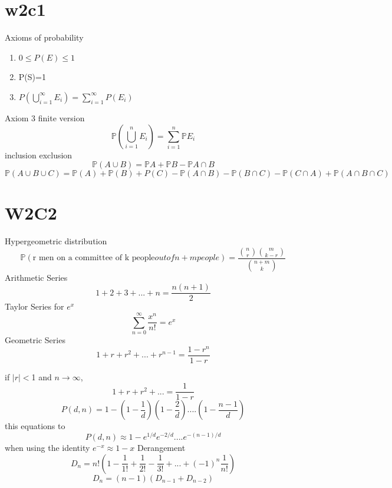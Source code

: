 \documentclass{article}
\begin{document}
\section{w2c1}
Axioms of probability
\begin{enumerate}
  \item 0$\leq P(E)\leq 1$
  \item P(S)=1
  \item $P(\bigcup_{i=1}^{\infty}E_i)=\sum_{i=1}^{\infty}P(E_i)$
\end{enumerate}
Axiom 3 finite version\\
$$
\mathbb{P}(\bigcup_{i=1}^{n}E_i)=\sum_{i=1}^n\mathbb{P}{E_i}
$$
inclusion exclusion
$$
\mathbb{P}(A \cup B)=\mathbb{P}A+\mathbb{P}B-\mathbb{P}{A\cap B}
$$
$$
\mathbb{P}(A\cup B \cup C )=\mathbb{P}(A)+\mathbb{P}(B)+P(C)-\mathbb{P}(A\cap B)- \mathbb{P}(B\cap C)-\mathbb{P}(C\cap A)+\mathbb{P}(A\cap B \cap C)
$$
\section{W2C2}
Hypergeometric distribution\\
$$
\mathbb {P}(\text{r men on a committee of k people} out of n+m people)=\frac{{n \choose r}{m \choose k-r}}{{n+m \choose k}}
$$
Arithmetic Series
$$
1+2+3+...+n=\frac{n(n+1)}{2}
$$
Taylor Series for $e^x$
$$
\sum_{n=0}^{\infty}\frac{x^n}{n!}=e^x
$$
Geometric Series
$$
1+r+r^2+...+r^{n-1}=\frac{1-r^n}{1-r}
$$

if $|r|<$1 and $n\rightarrow \infty$,
$$
1+r+r^2+...=\frac{1}{1-r}
$$
$$
P(d,n)=1-(1-\frac{1}{d})(1-\frac{2}{d})....(1-\frac{n-1}{d})
$$
this equations to
$$
P(d,n)\approx 1-e^{1/d}e^{-2/d}....e^{-(n-1)/d}
$$
when using the identity $e^{-x}\approx 1-x$
Derangement
$$
D_n=n!(1-\frac{1}{1!}+\frac{1}{2!}-\frac{1}{3!}+...+(-1)^n\frac{1}{n!})
$$
$$
D_n=(n-1)(D_{n-1}+D_{n-2})
$$
\end{document}

